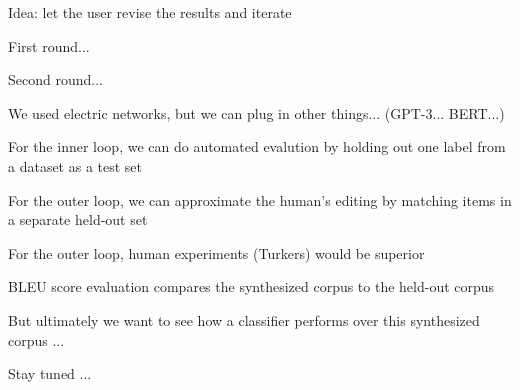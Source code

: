 \documentclass[12pt]{beamer}
\begin{document}
\begin{frame}{}
  Idea: let the user revise the results and iterate
\end{frame}

\begin{frame}{}
  First round...
\end{frame}

\begin{frame}{}
  Second round...
\end{frame}

\begin{frame}{}
  We used electric networks, but we can plug in other things... (GPT-3... BERT...)
\end{frame}

\begin{frame}{}
  For the inner loop, we can do automated evalution by holding out one label from a dataset as a test set
\end{frame}

\begin{frame}{}
  For the outer loop, we can approximate the human's editing by matching items in a separate held-out set
\end{frame}

\begin{frame}{}
  For the outer loop, human experiments (Turkers) would be superior
\end{frame}

\begin{frame}{}
  BLEU score evaluation compares the synthesized corpus to the held-out corpus
\end{frame}

\begin{frame}{}
  But ultimately we want to see how a classifier performs over this synthesized
  corpus ...

  Stay tuned ...
\end{frame}
\end{document}
